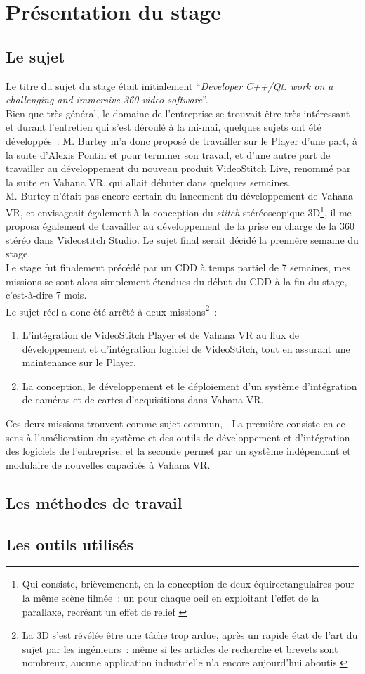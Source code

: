 \chapter{Présentation du stage}

\section{Le sujet}
Le titre du sujet du stage était initialement \enquote{\textit{Developer C++/Qt.
work on a challenging and immersive 360 video software}}.\\
Bien que très général, le domaine de l'entreprise se trouvait être très intéressant
et durant l'entretien qui s'est déroulé à la mi-mai, quelques sujets ont été
développés~: M. Burtey m'a donc proposé de travailler sur le Player d'une part,
à la suite d'Alexis Pontin et pour terminer son travail, et d'une autre part de
travailler au développement du nouveau produit VideoStitch Live, renommé par la
suite en Vahana VR, qui allait débuter dans quelques semaines.\\
M. Burtey n'était pas encore certain du lancement du développement de Vahana VR, 
et envisageait également à la conception du \textit{stitch} stéréoscopique 3D\footnote{Qui
consiste, brièvemenent, en la conception de deux équirectangulaires pour la même
scène filmée~: un pour chaque oeil en exploitant l'effet de la parallaxe, recréant 
un effet de relief\cite{videostitch-stereo}
\cite{image-stereoscopique}}, il me proposa également de travailler au développement
de la prise en charge de la 360 stéréo dans Videostitch Studio. Le sujet final serait
décidé la première semaine du stage.\\
\newline
Le stage fut finalement précédé par un CDD à temps partiel de 7 semaines, mes missions
se sont alors simplement étendues du début du CDD à la fin du stage, c'est-à-dire 
7 mois.\\
Le sujet réel a donc été arrêté à deux missions\footnote{La 3D s'est révélée être 
une tâche trop ardue, après un rapide état de l'art du sujet par les ingénieurs~: 
même si les articles de recherche et brevets sont nombreux, aucune application 
industrielle n'a encore aujourd'hui aboutis.}~:
\begin{enumerate}
\item L'intégration de VideoStitch Player et de Vahana VR au flux de développement et d'intégration
logiciel de VideoStitch, tout en assurant une maintenance sur le Player.
\item La conception, le développement et le déploiement d'un système
d'intégration de caméras et de cartes d'acquisitions dans Vahana VR.
\end{enumerate}
Ces deux missions trouvent comme sujet commun, . La première consiste en 
ce sens à l'amélioration du système et des outils de développement et d'intégration des logiciels
de l'entreprise; et la seconde permet par un système indépendant et modulaire de
nouvelles capacités à Vahana VR.

\section{Les méthodes de travail}

\section{Les outils utilisés}
